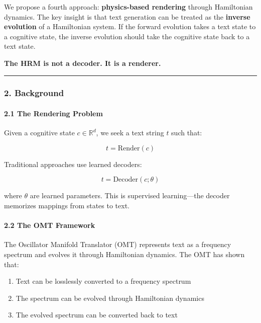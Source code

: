 \documentclass[
  11pt,
  a4paper,
]{article}
\providecommand{\tightlist}{%
  \setlength{\itemsep}{0pt}\setlength{\parskip}{0pt}}
\begin{document}
We propose a fourth approach: \textbf{physics-based rendering} through
Hamiltonian dynamics. The key insight is that text generation can be
treated as the \textbf{inverse evolution} of a Hamiltonian system. If
the forward evolution takes a text state to a cognitive state, the
inverse evolution should take the cognitive state back to a text state.

\textbf{The HRM is not a decoder. It is a renderer.}

\begin{center}\rule{0.5\linewidth}{0.5pt}\end{center}

\subsubsection{2. Background}\label{background}

\paragraph{2.1 The Rendering Problem}\label{the-rendering-problem}

Given a cognitive state \(c \in \mathbb{R}^d\), we seek a text string
\(t\) such that:

\[
t = \text{Render}(c)
\]

Traditional approaches use learned decoders:

\[
t = \text{Decoder}(c; \theta)
\]

where \(\theta\) are learned parameters. This is supervised
learning---the decoder memorizes mappings from states to text.

\paragraph{2.2 The OMT Framework}\label{the-omt-framework}

The Oscillator Manifold Translator (OMT) represents text as a frequency
spectrum and evolves it through Hamiltonian dynamics. The OMT has shown
that:

\begin{enumerate}
\def\labelenumi{\arabic{enumi}.}
\tightlist
\item
  Text can be losslessly converted to a frequency spectrum
\item
  The spectrum can be evolved through Hamiltonian dynamics
\item
  The evolved spectrum can be converted back to text
\end{enumerate}
\end{document}
